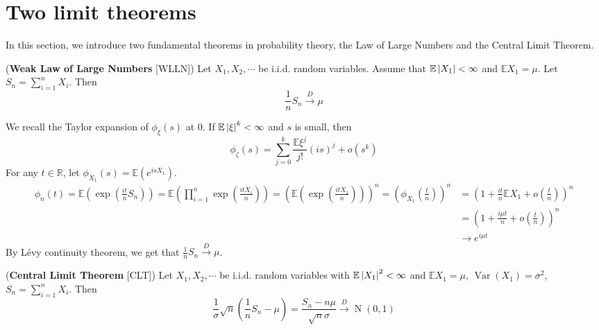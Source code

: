 \documentclass{huhtakm-template-book}
\newcommand{\expect}{\mathbb{E}}
\DeclareMathOperator{\N}{N}
\DeclareMathOperator{\Var}{Var}
\begin{document}
\section{Two limit theorems}
In this section, we introduce two fundamental theorems in probability theory, the Law of Large Numbers and the Central Limit Theorem.
\begin{thm}(\textbf{Weak Law of Large Numbers} [WLLN])
	Let $X_{1},X_{2},\cdots$ be i.i.d. random variables. Assume that $\expect\abs{X_{1}}<\infty$ and $\expect X_{1}=\mu$. Let $S_{n}=\sum_{i=1}^{n}X_{i}$. Then
	\begin{equation*}
		\frac{1}{n}S_{n}\xrightarrow{D}\mu
	\end{equation*}
\end{thm}
\begin{proofing}
	We recall the Taylor expansion of $\phi_{\xi}(s)$ at $0$. If $\expect\abs{\xi}^{k}<\infty$ and $s$ is small, then
	\begin{equation*}
		\phi_{\zeta}(s)=\sum_{j=0}^{k}\frac{\expect\xi^{j}}{j!}(is)^{j}+o(s^{k})
	\end{equation*}
	For any $t\in\mathbb{R}$, let $\phi_{X_{1}}(s)=\expect(e^{isX_{1}})$.
	\begin{align*}
		\phi_{n}(t)=\expect\left(\exp\left(\frac{it}{n}S_{n}\right)\right)=\expect\left(\prod_{i=1}^{n}\exp\left(\frac{itX_{i}}{n}\right)\right)=\left(\expect\left(\exp\left(\frac{itX_{1}}{n}\right)\right)\right)^{n}=\left(\phi_{X_{1}}\left(\frac{t}{n}\right)\right)^{n}&=\left(1+\frac{it}{n}\expect X_{1}+o\left(\frac{t}{n}\right)\right)^{n}\\
		&=\left(1+\frac{i\mu t}{n}+o\left(\frac{t}{n}\right)\right)^{n}\\
		&\to e^{i\mu t}
	\end{align*}
	By L\'evy continuity theorem, we get that $\frac{1}{n}S_{n}\xrightarrow{D}\mu$.
\end{proofing}
\begin{thm}(\textbf{Central Limit Theorem} [CLT])
	Let $X_{1},X_{2},\cdots$ be i.i.d. random variables with $\expect\abs{X_{1}}^{2}<\infty$ and $\expect X_{1}=\mu$, $\Var(X_{1})=\sigma^{2}$, $S_{n}=\sum_{i=1}^{n}X_{i}$. Then
	\begin{equation*}
		\frac{1}{\sigma}\sqrt{n}\left(\frac{1}{n}S_{n}-\mu\right)=\frac{S_{n}-n\mu}{\sqrt{n}\sigma}\xrightarrow{D}\N(0,1)
	\end{equation*}
\end{thm}
\end{document}
